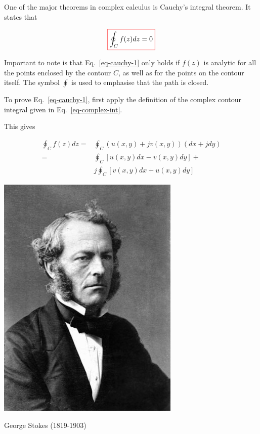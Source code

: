 One of the major theorems in complex calculus is Cauchy's integral theorem. It states that 

\begin{equation}
\fbox{$\displaystyle
\oint_{{C}} f(z) dz = 0 \label{eq-cauchy-1}
$}
\end{equation}

Important to note is that Eq.~\ref{eq-cauchy-1} only holds if $f(z)$ is analytic for all the points enclosed by the contour ${C}$, as well as for the points on the contour itself. The symbol $\oint$ is used to emphasise that the path is closed.

\begin{cue}
To prove Eq.~\ref{eq-cauchy-1}, first apply the definition of the complex contour integral given in Eq.~\ref{eq-complex-int}.
\end{cue}

This gives

\begin{align}
\oint_{C}f(z)dz = & \oint_{C}\left(u(x,y)+jv(x,y)\right)(dx+jdy)
\nonumber \\
  = & \oint_{C}\left[u(x,y)dx-v(x,y)dy\right] + \nonumber \\
  & j \oint_{C}\left[v(x,y)dx+u(x,y)dy\right]  \label{eq-cauchy-proof}
\end{align}

\begin{marginfigure}[-0.0cm]
  \includegraphics{complex/figures/stokes}
  \caption{George Stokes (1819-1903)}
\end{marginfigure}

